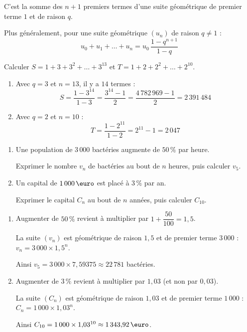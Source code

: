 \documentclass{poly}
\begin{document}
\begin{rem}
	C'est la somme des $n + 1$ premiers termes d'une suite géométrique de premier terme $1$ et de raison $q$.

	Plus généralement, pour une suite géométrique $(u_n)$ de raison $q \neq 1$ :
	\[
		u_0 + u_1 + \dots + u_n = u_0\,\dfrac{1 - q^{n+1}}{1 - q}
	\]
\end{rem}

\begin{methode}
	Calculer $S = 1 + 3 + 3^2 + \dots + 3^{13}$ et $T = 1 + 2 + 2^2 + \dots + 2^{10}$.

	\begin{correction}
		\nline
		\begin{enumerate}
			\item Avec $q = 3$ et $n = 13$, il y a $14$ termes :
			      \[
				      S = \dfrac{1 - 3^{14}}{1 - 3} = \dfrac{3^{14} - 1}{2} = \dfrac{4\,782\,969 - 1}{2} = 2\,391\,484
			      \]
			\item Avec $q = 2$ et $n = 10$ :
			      \[
				      T = \dfrac{1 - 2^{11}}{1 - 2} = 2^{11} - 1 = 2\,047
			      \]
		\end{enumerate}
	\end{correction}
\end{methode}

\begin{methode}
	\begin{enumerate}
		\item Une population de $3\,000$ bactéries augmente de $50\,\%$ par heure.

		      Exprimer le nombre $v_n$ de bactéries au bout de $n$ heures, puis calculer $v_5$.
		\item Un capital de $1\,000\,\text{\euro}$ est placé à $3\,\%$ par an.

		      Exprimer le capital $C_n$ au bout de $n$ années, puis calculer $C_{10}$.
	\end{enumerate}

	\begin{correction}
		\nline
		\begin{enumerate}
			\item Augmenter de $50\,\%$ revient à multiplier par $1 + \dfrac{50}{100} = 1{,}5$.

			      La suite $(v_n)$ est géométrique de raison $1{,}5$ et de premier terme $3\,000$ : $v_n = 3\,000 \times 1{,}5^n$.

			      Ainsi $v_5 = 3\,000 \times 7{,}59375 \approx 22\,781$ bactéries.
			\item Augmenter de $3\,\%$ revient à multiplier par $1{,}03$ (et non par $0{,}03$).

			      La suite $(C_n)$ est géométrique de raison $1{,}03$ et de premier terme $1\,000$ : $C_n = 1\,000 \times 1{,}03^n$.

			      Ainsi $C_{10} = 1\,000 \times 1{,}03^{10} \approx 1\,343{,}92\,\text{\euro}$.
		\end{enumerate}
	\end{correction}
\end{methode}
\end{document}
